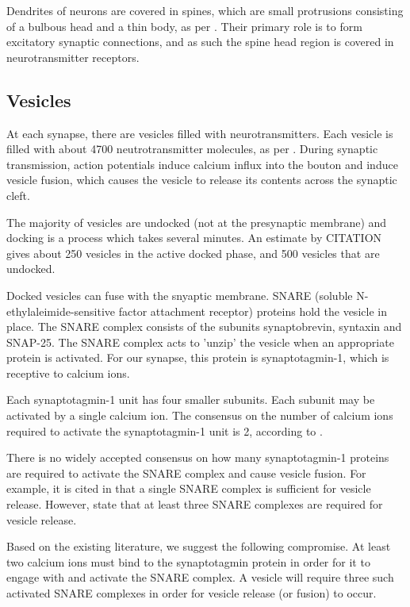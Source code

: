 \documentclass[a4paper]{article}
\begin{document}
Dendrites of neurons are covered in spines, which are small protrusions consisting of a bulbous head and a thin body, as per \cite{Arellano:FrontNeurosci:2007}. Their primary role is to form excitatory synaptic connections, and as such the spine head region is covered in neurotransmitter receptors.


\subsection{Vesicles}

At each synapse, there are vesicles filled with neurotransmitters. Each vesicle is filled with about 4700 neutrotransmitter molecules, as per \cite{Bruns:Nature:1995}. During synaptic transmission, action potentials induce calcium influx into the bouton and induce vesicle fusion, which causes the vesicle to release its contents across the synaptic cleft.

The majority of vesicles are undocked (not at the presynaptic membrane) and docking is a process which takes several minutes. An estimate by CITATION gives about 250 vesicles in the active docked phase, and 500 vesicles that are undocked.

Docked vesicles can fuse with the snyaptic membrane. SNARE (soluble N-ethylaleimide-sensitive factor attachment receptor) proteins hold the vesicle in place. The SNARE complex consists of the subunits synaptobrevin, syntaxin and SNAP-25. The SNARE complex acts to 'unzip' the vesicle when an appropriate protein is activated. For our synapse, this protein is synaptotagmin-1, which is receptive to calcium ions. 

Each synaptotagmin-1 unit has four smaller subunits. Each subunit may be activated by a single calcium ion. The consensus on the number of calcium ions required to activate the synaptotagmin-1 unit is 2, according to \cite{Dittrich:BiophysJ:2013}.

There is no widely accepted consensus on how many synaptotagmin-1 proteins are required to activate the SNARE complex and cause vesicle fusion. For example, it is cited in \cite{vandenBogaart:NatStructMolBiol:2010} that a single SNARE complex is sufficient for vesicle release. However, \cite{Dittrich:BiophysJ:2013} state that at least three SNARE complexes are required for vesicle release.

Based on the existing literature, we suggest the following compromise. At least two calcium ions must bind to the synaptotagmin protein in order for it to engage with and activate the SNARE complex. A vesicle will require three such activated SNARE complexes in order for vesicle release (or fusion) to occur.
\end{document}
